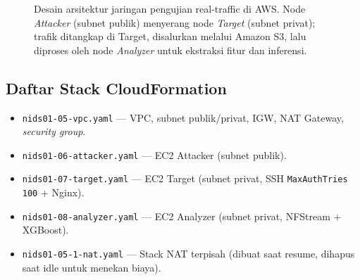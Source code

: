 \documentclass[11pt, a4paper]{article}
\begin{document}
\begin{figure}[htbp]
{%
}
\caption{Desain arsitektur jaringan pengujian real-traffic di AWS. Node \textit{Attacker} (subnet publik) menyerang node \textit{Target} (subnet privat); trafik ditangkap di Target, disalurkan melalui Amazon S3, lalu diproses oleh node \textit{Analyzer} untuk ekstraksi fitur dan inferensi.}
\label{fig:aws_arch}
\end{figure}

\subsection{Daftar Stack CloudFormation}
\begin{itemize}[leftmargin=1.4cm]
    \item \texttt{nids01-05-vpc.yaml} --- VPC, subnet publik/privat, IGW, NAT Gateway, \textit{security group}.
    \item \texttt{nids01-06-attacker.yaml} --- EC2 Attacker (subnet publik).
    \item \texttt{nids01-07-target.yaml} --- EC2 Target (subnet privat, SSH \texttt{MaxAuthTries 100} + Nginx).
    \item \texttt{nids01-08-analyzer.yaml} --- EC2 Analyzer (subnet privat, NFStream + XGBoost).
    \item \texttt{nids01-05-1-nat.yaml} --- Stack NAT terpisah (dibuat saat resume, dihapus saat idle untuk menekan biaya).
\end{itemize}
\end{document}
